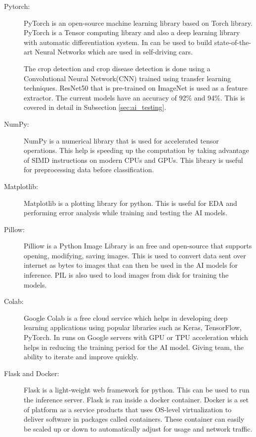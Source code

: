 \documentclass[../Report.tex]{subfiles}
\begin{document}
\begin{description}
  \item[Pytorch:] PyTorch\cite{pytorch} is an open-source machine learning library based on Torch library. PyTorch is a Tensor computing library and also 
  a deep learning library with automatic differentiation system. In can be used to build state-of-the-art Neural Networks which are used in
  self-driving cars.\par
  The crop detection and crop disease detection is done using a Convolutional Neural Network(CNN)\cite{cnn} trained using transfer learning 
  techniques. ResNet50\cite{resnet} that is pre-trained on ImageNet\cite{imagenet} is used as a feature extractor.
  The current models have an accuracy of 92\% and 94\%. This is covered in detail in Subsection \ref{sec:ai_testing}.

  \item[NumPy:] NumPy\cite{numpy} is a numerical library that is used for accelerated tensor operations. This help is speeding up the computation by 
  taking advantage of SIMD instructions on modern CPUs and GPUs. This library is useful for preprocessing data before classification.

  \item[Matplotlib:] Matplotlib\cite{pyplot} is a plotting library for python. This is useful for EDA and performing error analysis while training 
  and testing the AI models.

  \item[Pillow:] Pilliow\cite{pillow} is a Python Image Library is an free and open-source that supports opening, modifying, saving images. This is 
  used to convert data sent over internet as bytes to images that can then be used in the AI models for inference. PIL is also used to load 
  images from disk for training the models.

  \item[Colab:] Google Colab\cite{colab} is a free cloud service which helps in developing deep learning applications using popular libraries such 
  as Keras, TensorFlow, PyTorch. In runs on Google servers with GPU or TPU acceleration which helps in reducing the training period for 
  the AI model. Giving team, the ability to iterate and improve quickly.

  \item[Flask and Docker:] Flask\cite{flask} is a light-weight web framework for python. This can be used to run the inference server. Flask is ran
  inside a docker container. Docker is a set of platform as a service products that uses OS-level virtualization to deliver software in 
  packages called containers. These container can easily be scaled up or down to automatically adjust for usage and network traffic.


\end{description}
\end{document}
